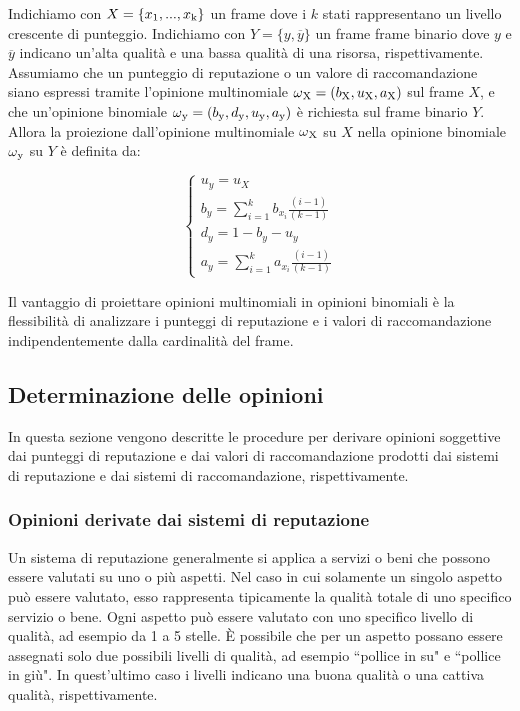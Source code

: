 \documentclass[letterpaper]{article} %
\begin{document}
Indichiamo con $X=\{x\textsubscript{1},...,x\textsubscript{k}\}$ un frame dove i $k$ stati rappresentano un
livello crescente di punteggio. Indichiamo con $Y=\{y,\overline{y}\}$ un frame
frame binario dove $y$ e $\overline{y}$ indicano un'alta qualità e una bassa qualità
di una risorsa, rispettivamente. Assumiamo che un punteggio di
reputazione o un valore di raccomandazione siano espressi tramite
l'opinione multinomiale $\omega\textsubscript{X}=(b\textsubscript{X},u\textsubscript{X},a\textsubscript{X})$ sul frame $X$, e che un'opinione
binomiale $\omega\textsubscript{y}=(b\textsubscript{y},d\textsubscript{y},u\textsubscript{y},a\textsubscript{y})$ è richiesta sul frame binario $Y$. Allora la
proiezione dall'opinione multinomiale $\omega\textsubscript{X}$ su $X$ nella opinione
binomiale $\omega\textsubscript{y}$ su $Y$ è definita da: 

\begin{center}
	\begin{equation}
	\begin{cases}
	u_y=u_X\\
	b_y=\sum_{i=1}^k b_{x_i} \frac{(i-1)}{(k-1)}\\
	d_y=1-b_y-u_y\\
	a_y=\sum_{i=1}^k a_{x_i} \frac{(i-1)}{(k-1)}
	\end{cases} \label{equazione4}
	\end{equation}
\end{center}


Il vantaggio di proiettare opinioni multinomiali in opinioni binomiali è
la flessibilità di analizzare i punteggi di reputazione e i valori di
raccomandazione indipendentemente dalla cardinalità del frame.

\subsection{Determinazione delle opinioni}

In questa sezione vengono descritte le procedure per derivare opinioni
soggettive dai punteggi di reputazione e dai valori di raccomandazione
prodotti dai sistemi di reputazione e dai sistemi di raccomandazione,
rispettivamente.

\subsubsection{Opinioni derivate dai sistemi di	reputazione}

Un sistema di reputazione generalmente si applica a servizi o beni che
possono essere valutati su uno o più aspetti. Nel caso in cui solamente
un singolo aspetto può essere valutato, esso rappresenta tipicamente la
qualità totale di uno specifico servizio o bene. Ogni aspetto può essere
valutato con uno specifico livello di qualità, ad esempio da 1 a 5
stelle. È possibile che per un aspetto possano essere assegnati solo due
possibili livelli di qualità, ad esempio ``pollice in su" e ``pollice in
giù". In quest'ultimo caso i livelli indicano una buona qualità o una
cattiva qualità, rispettivamente.
\end{document}
